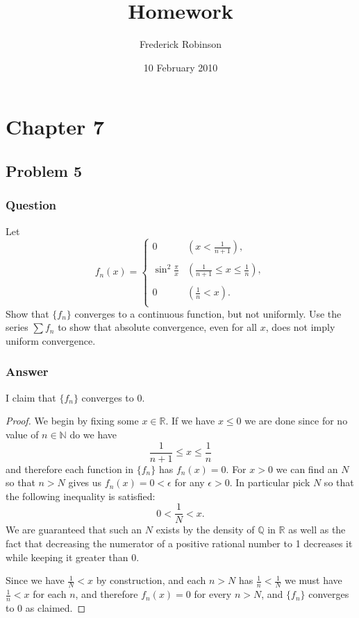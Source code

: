 \documentclass[12pt]{article}
\title{Homework}
\author{Frederick Robinson}
\date{10 February 2010}
\begin{document}

   \maketitle

\setcounter{tocdepth}{2} 


\section{Chapter 7}
\subsection{Problem 5}
\subsubsection{Question}
Let
\[
f_n(x)= 
\left\{\begin{array}{ll}0 & \displaystyle \left(x < \frac{1}{n+1}\right),\\\\\displaystyle \sin^2{\frac{\pi}{x}}& \displaystyle  \left(\frac{1}{n+1} \leq x\leq \frac{1}{n}\right), \\\\0& \displaystyle  \left(\frac{1}{n}<x\right).\\ \end{array}\right.
\]
Show that $\{f_n\}$ converges to a continuous function, but not uniformly. Use the series $\sum f_n$ to show that absolute convergence, even for all $x$, does not imply uniform convergence.
\subsubsection{Answer}

I claim that $\{f_n\}$ converges to $0$. 
\begin{proof}
We begin by fixing some $x \in \mathbb{R}$. If we have $x \leq 0 $ we are done since for no value of $n \in \mathbb{N}$ do we have 
\[\frac{1}{n+1} \leq x\leq \frac{1}{n}\]
and therefore each function in $\{f_n\}$ has $f_n(x)=0$. For $x> 0$ we can find an $N$ so that $n > N $ gives us $f_n(x)=0< \epsilon$ for any $\epsilon >0$. In particular pick $N$ so that the following inequality is satisfied:
\[ 0< \frac{1}{N}<x.\]
We are guaranteed that such an $N$ exists by the density of $\mathbb{Q}$ in $\mathbb{R}$ as well as the fact that decreasing the numerator of a positive rational number to 1 decreases it while keeping it greater than 0.

Since we have $\frac{1}{N}<x$ by construction, and each $n >N$ has $\frac{1}{n} <\frac{1}{N}$ we must have $\frac{1}{n}<x$ for each $n$, and therefore $f_n(x)=0$ for every $n > N$, and $\{f_n\}$ converges to 0 as claimed.
\end{proof}
\end{document}
